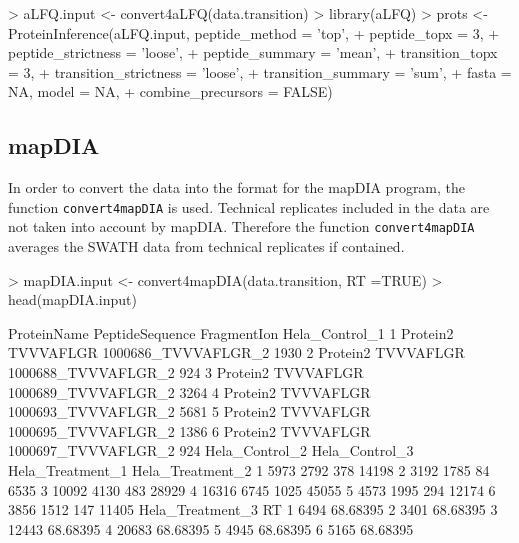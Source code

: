 \documentclass[a4paper]{article}
\begin{document}
\begin{Schunk}
\begin{Sinput}
> aLFQ.input <- convert4aLFQ(data.transition)
> library(aLFQ)
> prots <- ProteinInference(aLFQ.input, peptide_method = 'top',
+                           peptide_topx = 3,
+                           peptide_strictness = 'loose',
+                           peptide_summary = 'mean',
+                           transition_topx = 3,
+                           transition_strictness = 'loose',
+                           transition_summary = 'sum',
+                           fasta = NA, model = NA,
+                           combine_precursors = FALSE)
\end{Sinput}
\end{Schunk}

\subsection{mapDIA}
In order to convert the data into the  format for the mapDIA program, the function \texttt{convert4mapDIA} is used. Technical replicates included in the data are not taken into account by mapDIA. Therefore the function \texttt{convert4mapDIA} averages the SWATH data from technical replicates if contained.
\begin{Schunk}
\begin{Sinput}
> mapDIA.input <- convert4mapDIA(data.transition, RT =TRUE)
> head(mapDIA.input)
\end{Sinput}
\begin{Soutput}
  ProteinName PeptideSequence         FragmentIon Hela_Control_1
1    Protein2       TVVVAFLGR 1000686_TVVVAFLGR_2           1930
2    Protein2       TVVVAFLGR 1000688_TVVVAFLGR_2            924
3    Protein2       TVVVAFLGR 1000689_TVVVAFLGR_2           3264
4    Protein2       TVVVAFLGR 1000693_TVVVAFLGR_2           5681
5    Protein2       TVVVAFLGR 1000695_TVVVAFLGR_2           1386
6    Protein2       TVVVAFLGR 1000697_TVVVAFLGR_2            924
  Hela_Control_2 Hela_Control_3 Hela_Treatment_1 Hela_Treatment_2
1           5973           2792              378            14198
2           3192           1785               84             6535
3          10092           4130              483            28929
4          16316           6745             1025            45055
5           4573           1995              294            12174
6           3856           1512              147            11405
  Hela_Treatment_3       RT
1             6494 68.68395
2             3401 68.68395
3            12443 68.68395
4            20683 68.68395
5             4945 68.68395
6             5165 68.68395
\end{Soutput}
\end{Schunk}
\end{document}
